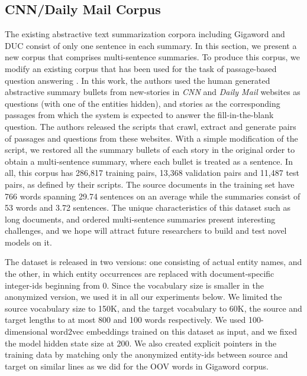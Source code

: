 \documentclass[11pt]{article}
\begin{document}
\subsection{CNN/Daily Mail Corpus}
The existing abstractive text summarization corpora including Gigaword and DUC consist of only one sentence in each summary. In this section, we present a new corpus that comprises multi-sentence summaries. To produce this corpus, we modify an existing corpus that has been used for the task of passage-based question answering \cite{reading_comprehension}. In this work, the authors used the human generated abstractive summary bullets from new-stories in {\it CNN} and {\it Daily Mail} websites as questions (with one of the entities hidden), and stories as the corresponding passages from which the system is expected to answer the fill-in-the-blank question. The authors released the scripts that crawl,  extract and generate pairs of passages and questions from these websites. With a simple modification of the script, we restored all the summary bullets of each story in the original order to obtain a multi-sentence summary, where each bullet is treated as a sentence. In all, this corpus has 286,817 training pairs, 13,368 validation pairs and 11,487 test pairs, as defined by their scripts. The source documents in the training set have 766 words spanning 29.74 sentences on an average while the summaries consist of 53 words and 3.72 sentences. The unique characteristics of this dataset such as long documents, and ordered multi-sentence summaries present interesting challenges, and we hope will attract future researchers to build and test novel models on it.


The dataset is released in two versions: one consisting of actual entity names, and the other, in which entity occurrences are replaced with document-specific integer-ids beginning from 0. Since the vocabulary size is smaller in the anonymized version, we used it in all our experiments below. We limited the source vocabulary size to 150K, and the target vocabulary to 60K, the source and target lengths to at most 800 and 100 words respectively. We used 100-dimensional word2vec embeddings trained on this dataset as input, and we fixed the model hidden state size at 200. We also created explicit pointers in the training data by matching only the anonymized entity-ids between source and target on similar lines as we did for the OOV words in Gigaword corpus. 
\end{document}
